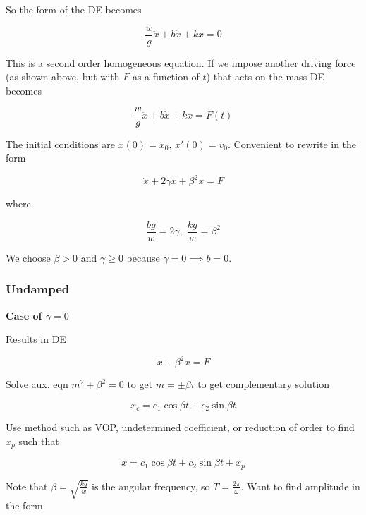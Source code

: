 So the form of the DE becomes

\begin{equation}
    \frac{w}{g}\ddot x+b\dot x+kx=0
\end{equation}

This is a second order homogeneous equation. If we impose another driving force (as shown above, but with $F$ as a function of $t$) that acts on the mass DE becomes

\begin{equation}
    \frac{w}{g}\ddot x+b\dot x+kx=F(t)
\end{equation}

The initial conditions are $x(0)=x_0$, $x'(0)=v_0$. Convenient to rewrite in the form

\begin{equation}
    \ddot x+2\gamma \dot x+\beta^2 x = F
\end{equation}

where

\begin{equation}
    \frac{bg}{w}=2\gamma,\; \frac{kg}{w}=\beta^2
\end{equation}

We choose $\beta>0$ and $\gamma \geq 0$ because $\gamma = 0\implies b=0$.

\subsubsection{Undamped}

\textbf{Case of $\gamma = 0$}

Results in DE

\begin{equation}
    \ddot x +\beta^2 x= F
\end{equation}

Solve aux. eqn $m^2+\beta^2=0$ to get $m =\pm \beta i$ to get complementary solution

\begin{equation}
    x_c=c_1\cos\beta t + c_2\sin\beta t
\end{equation}

Use method such as VOP, undetermined coefficient, or reduction of order to find $x_p$ such that

\begin{equation}
    x = c_1\cos\beta t + c_2\sin\beta t + x_p
\end{equation}

Note that $\beta = \sqrt{\frac{kg}{w}}$ is the angular frequency, so $T=\frac{2\pi}{\omega}$.
Want to find amplitude in the form

